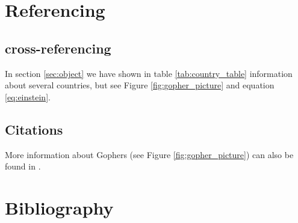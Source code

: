 \documentclass{article}
\begin{document}
\section{Referencing}
\subsection{cross-referencing}
In section \ref{sec:object} we have shown in table \ref{tab:country_table} information about several countries, but see Figure \ref{fig:gopher_picture} and equation \ref{eq:einstein}.

\subsection{Citations}
More information about Gophers (see Figure \ref{fig:gopher_picture}) can also be found in \citep{gopher_paper}.

\section{Bibliography}


\end{document}
